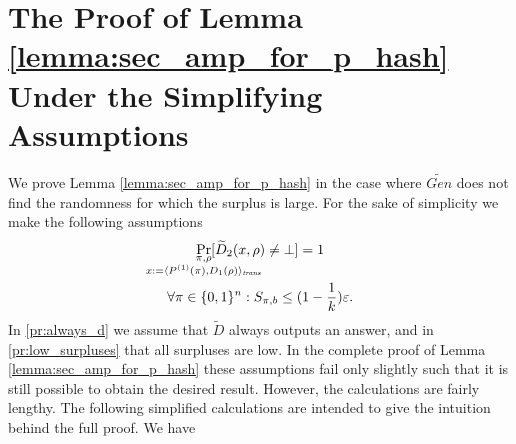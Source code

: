 \section{The Proof of Lemma \ref{lemma:sec_amp_for_p_hash} Under the Simplifying Assumptions}
\label{st:proofSimAssm}
We prove Lemma \ref{lemma:sec_amp_for_p_hash} in the case where $\widetilde{Gen}$ does not find the randomness for which the surplus is large.
For the sake of simplicity we make the following assumptions
\begin{gather}
  \label{pr:always_d}
\underset{
  \mathclap{
  \substack{\pi, \rho \\ x := \langle P^{(1)}(\pi), D_1(\rho) \rangle_{\trans}}}}
{\Pr}[\widetilde{D}_2(x,\rho) \neq \bot] = 1 \\
  \label{pr:low_surpluses}
\forall \pi \in \{0,1\}^{n} : S_{\pi, b} \leq (1 - \frac{1}{k})\epsilon.
\end{gather}
In \eqref{pr:always_d} we assume that $\widetilde{D}$ always outputs an answer, and in \eqref{pr:low_surpluses} that all surpluses are low.
In the complete proof of Lemma \ref{lemma:sec_amp_for_p_hash} these assumptions fail only slightly such that it is still possible
to obtain the desired result. However, the calculations are fairly lengthy.
The following simplified calculations are intended to give the intuition behind the full proof.
We have
